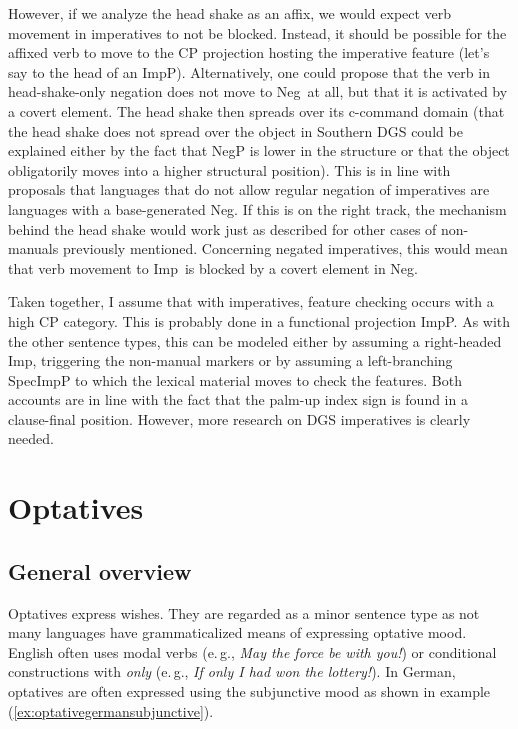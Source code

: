\noindent However, if we analyze the head shake as an affix, we would expect verb movement in imperatives to not be blocked. Instead, it should be possible for the affixed verb to move to the CP projection hosting the imperative feature (let's say to the head of an ImpP). Alternatively, one could propose that the verb in head-shake-only negation does not move to Neg\textdegree\ at all, but that it is activated by a covert element. The head shake then spreads over its c-command domain (that the head shake does not spread over the object in Southern DGS could be explained either by the fact that NegP is lower in the structure or that the object obligatorily moves into a higher structural position). This is in line with \citet{zeijlstra2004sentential} proposals that languages that do not allow regular negation of imperatives are languages with a base-generated Neg\textdegree . If this is on the right track, the mechanism behind the head shake would work just as described for other cases of non-manuals previously mentioned. Concerning negated imperatives, this would mean that verb movement to Imp\textdegree\ is blocked by a covert element in Neg\textdegree . 


Taken together, I assume that with imperatives, feature checking occurs with a high CP category. This is probably done in a functional projection ImpP. As with the other sentence types, this can be modeled either by assuming a right-headed Imp\textdegree , triggering the non-manual markers or by assuming a left-branching SpecImpP to which the lexical material moves to check the features. Both accounts are in line with the fact that the palm-up index sign is found in a clause-final position. However, more research on DGS imperatives is clearly needed.



\section{Optatives}\label{opt}
\subsection{General overview}
Optatives express wishes. They are regarded as a minor sentence type as not many languages have grammaticalized means of expressing optative mood. English often uses modal verbs (e.\,g., \textit{May the force be with you!}) or conditional constructions with \textit{only} (e.\,g., \textit{If only I had won the lottery!}). In German, optatives are often expressed using the subjunctive mood as shown in example (\ref{ex:optativegermansubjunctive}). 



